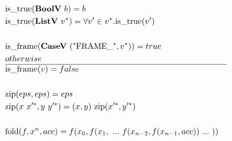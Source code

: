 \begin{align*}
%
\newline \\
  &\istrue(\boolv ~ b) = b \\
  &\istrue(\listv ~ \seq v) = \forall v' \in \seq v. \istrue (v') \\
%
\newline \\
  &\isframe(\casev ~ (\text{"FRAME\_"}, \seq v)) = true \\
  &otherwise \\
  \hline
  &\isframe(v) = false \\
%
\newline \\
  &\zip(eps, eps) = eps \\
  &\zip(x ~ \seq{x'}, y ~ \seq{y'}) = (x, y) ~ \zip (\seq{x'}, \seq{y'}) \\
%
\newline \\
  &\fold(f, x^n, acc) = f(x_0, f(x_1, ~ ... ~ f(x_{n-2}, f(x_{n-1}, acc)) ~ ... ~ ))
\end{align*}





